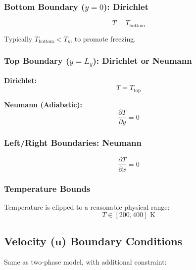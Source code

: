 \documentclass[12pt]{article}
\begin{document}
\subsubsection{Bottom Boundary ($y = 0$): Dirichlet}

\begin{equation}
T = T_{\text{bottom}}
\label{eq:temperature_bottom}
\end{equation}

Typically $T_{\text{bottom}} < T_m$ to promote freezing.

\subsubsection{Top Boundary ($y = L_y$): Dirichlet or Neumann}

\textbf{Dirichlet:}
\begin{equation}
T = T_{\text{top}}
\label{eq:temperature_top_dirichlet}
\end{equation}

\textbf{Neumann (Adiabatic):}
\begin{equation}
\frac{\partial T}{\partial y} = 0
\label{eq:temperature_top_neumann}
\end{equation}

\subsubsection{Left/Right Boundaries: Neumann}

\begin{equation}
\frac{\partial T}{\partial x} = 0
\label{eq:temperature_sides}
\end{equation}

\subsubsection{Temperature Bounds}

Temperature is clipped to a reasonable physical range:
\begin{equation}
T \in [200, 400] \text{ K}
\label{eq:temperature_bounds}
\end{equation}

\subsection{Velocity ($\mathbf{u}$) Boundary Conditions}

Same as two-phase model, with additional constraint:
\end{document}
